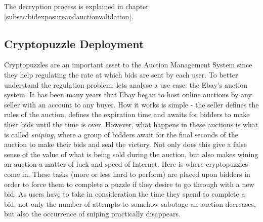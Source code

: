 \documentclass[a4paper]{article}
\begin{document}
The decryption process is explained in chapter \ref{subsec:bidexposureandauctionvalidation}.

\subsection{Cryptopuzzle Deployment}

Cryptopuzzles are an important asset to the Auction Management System since they help regulating the rate at which bids are sent by each user.
To better understand the regulation problem, lets analyse a use case: the Ebay's auction system.
It has been many years that Ebay began to host online auctions by any seller with an account to any buyer.
How it works is simple - the seller defines the rules of the auction, defines the expiration time and awaits for bidders to make their bids until the time is over.
However, what happens in these auctions is what is called \emph{sniping}, where a group of bidders await for the final seconds of the auction to make their bids and seal the victory. 
Not only does this give a false sense of the value of what is being sold during the auction, but also makes wining an auction a matter of luck and speed of Internet.
Here is where cryptopuzzles come in.
These tasks (more or less hard to perform) are placed upon bidders in order to force them to complete a puzzle if they desire to go through with a new bid.
As users have to take in consideration the time they spend to complete a bid, not only the number of attempts to somehow sabotage an auction decreases, but also the occurrence of sniping practically disappears.
\end{document}
